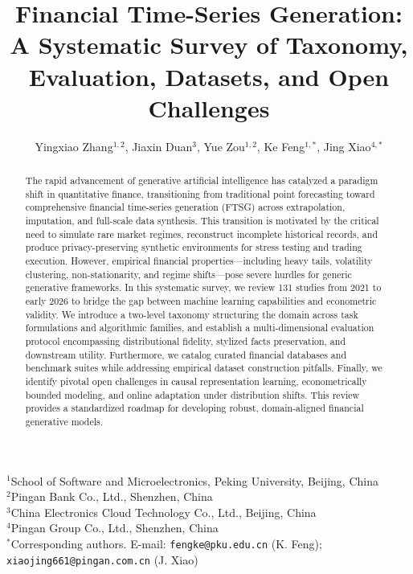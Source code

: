 \documentclass[11pt,a4paper]{article}
\title{\Large\textbf{Financial Time-Series Generation: A Systematic Survey of Taxonomy, Evaluation, Datasets, and Open Challenges}}
\author{
  Yingxiao Zhang$^{1,2}$, 
  Jiaxin Duan$^{3}$, 
  Yue Zou$^{1,2}$, 
  Ke Feng$^{1,*}$, 
  Jing Xiao$^{4,*}$
}
\date{}
\begin{document}
\maketitle

\vspace{-2em}
\begin{center}
\footnotesize
$^{1}$School of Software and Microelectronics, Peking University, Beijing, China\\[0.3em]
$^{2}$Pingan Bank Co., Ltd., Shenzhen, China\\[0.3em]
$^{3}$China Electronics Cloud Technology Co., Ltd., Beijing, China\\[0.3em]
$^{4}$Pingan Group Co., Ltd., Shenzhen, China\\[0.5em]
$^{*}$Corresponding authors. E-mail: \texttt{fengke@pku.edu.cn} (K. Feng); \texttt{xiaojing661@pingan.com.cn} (J. Xiao)
\end{center}
\vspace{1.5em}

\begin{abstract}
The rapid advancement of generative artificial intelligence has catalyzed a paradigm shift in quantitative finance, transitioning from traditional point forecasting toward comprehensive financial time-series generation (FTSG) across extrapolation, imputation, and full-scale data synthesis. This transition is motivated by the critical need to simulate rare market regimes, reconstruct incomplete historical records, and produce privacy-preserving synthetic environments for stress testing and trading execution. However, empirical financial properties---including heavy tails, volatility clustering, non-stationarity, and regime shifts---pose severe hurdles for generic generative frameworks. In this systematic survey, we review 131 studies from 2021 to early 2026 to bridge the gap between machine learning capabilities and econometric validity. We introduce a two-level taxonomy structuring the domain across task formulations and algorithmic families, and establish a multi-dimensional evaluation protocol encompassing distributional fidelity, stylized facts preservation, and downstream utility. Furthermore, we catalog curated financial databases and benchmark suites while addressing empirical dataset construction pitfalls. Finally, we identify pivotal open challenges in causal representation learning, econometrically bounded modeling, and online adaptation under distribution shifts. This review provides a standardized roadmap for developing robust, domain-aligned financial generative models.
\end{abstract}
\end{document}
